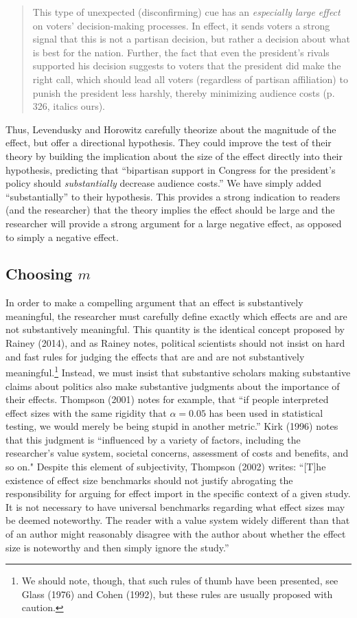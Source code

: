 \documentclass[12pt]{article}
\begin{document}
\begin{quote}
This type of unexpected (disconfirming) cue has an \emph{especially large effect} on voters' decision-making processes. In effect, it sends voters a strong signal that this is not a partisan decision, but rather a decision about what is best for the nation. Further, the fact that even the president's rivals supported his decision suggests to voters that the president did make the right call, which should lead all voters (regardless of partisan affiliation) to punish the president less harshly, thereby minimizing audience costs (p. 326, italics ours).
\end{quote}

Thus, Levendusky and Horowitz carefully theorize about the magnitude of the effect, but offer a directional hypothesis. They could improve the test of their theory by building the implication about the size of the effect directly into their hypothesis, predicting that ``bipartisan support in Congress for the president's policy should \emph{substantially} decrease audience costs.'' We have simply added ``substantially'' to their hypothesis. This provides a strong indication to readers (and the researcher) that the theory implies the effect should be large and the researcher will provide a strong argument for a large negative effect, as opposed to simply a negative effect. 

\subsection*{Choosing $m$}

In order to make a compelling argument that an effect is substantively meaningful, the researcher must carefully define exactly which effects are and are not substantively meaningful. This quantity is the identical concept proposed by Rainey (2014), and as Rainey notes, political scientists should not insist on hard and fast rules for judging the effects that are and are not substantively meaningful.\footnote{We should note, though, that such rules of thumb have been presented, see Glass (1976) and Cohen (1992), but these rules are usually proposed with caution.} Instead, we must insist that substantive scholars making substantive claims about politics also make substantive judgments about the importance of their effects. Thompson (2001) notes for example, that ``if people interpreted effect sizes with the same rigidity that $\alpha = 0.05$ has been used in statistical testing, we would merely be being stupid in another metric.'' Kirk (1996) notes that this judgment is ``influenced by a variety of factors, including the researcher's value system, societal concerns, assessment of costs and benefits, and so on." Despite this element of subjectivity, Thompson (2002) writes: ``[T]he existence of effect size benchmarks should not justify abrogating the responsibility for arguing for effect import in the specific context of a given study. It is not necessary to have universal benchmarks regarding what effect sizes may be deemed noteworthy. The reader with a value system widely different than that of an author might reasonably disagree with the author about whether the effect size is noteworthy and then simply ignore the study.'' 
\end{document}
